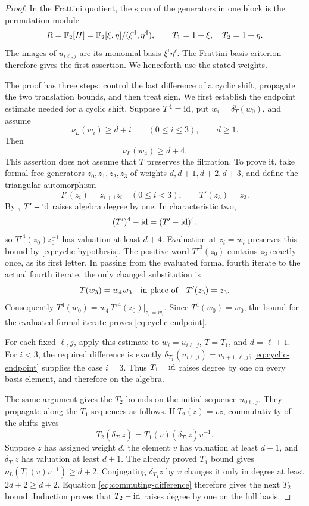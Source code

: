 \begin{proof}
In the Frattini quotient, the span of the generators in one block is
the permutation module
\[
 R=\mathbb F_2[H]
   =\mathbb F_2[\xi,\eta]/(\xi^4,\eta^4),
 \qquad T_1=1+\xi,\quad T_2=1+\eta.
\]
The images of \(u_{i\ell,j}\) are its monomial basis
\(\xi^i\eta^\ell\).  The Frattini basis criterion therefore gives the
first assertion.  We henceforth use the stated weights.

The proof has three steps: control the last difference of a cyclic
shift, propagate the two translation bounds, and then treat sign.
We first establish the endpoint estimate needed for a cyclic shift.
Suppose \(T^4=\operatorname{id}\), put \(w_i=\delta_T^i(w_0)\), and assume
\begin{equation}\label{eq:cyclic-hypothesis}
 \nu_L(w_i)\ge d+i\qquad(0\le i\le3),
 \qquad d\ge1.
\end{equation}
Then
\begin{equation}\label{eq:cyclic-endpoint}
 \nu_L(w_4)\ge d+4.
\end{equation}
This assertion does not assume that \(T\) preserves the filtration.
To prove it, take formal free generators \(z_0,z_1,z_2,z_3\) of weights
\(d,d+1,d+2,d+3\), and define the triangular automorphism
\[
 T'(z_i)=z_{i+1}z_i\quad(0\le i<3),
 \qquad T'(z_3)=z_3.
\]
By , \(T'-\operatorname{id}\) raises algebra degree by one.
In characteristic two,
\[
 (T')^4-\operatorname{id}=(T'-\operatorname{id})^4,
\]
so \(T'^4(z_0)z_0^{-1}\) has valuation at least \(d+4\).
Evaluation at \(z_i=w_i\) preserves this bound by
\eqref{eq:cyclic-hypothesis}.  The positive word \(T'^3(z_0)\) contains
\(z_3\) exactly once, as its first letter.  In passing from the
evaluated formal fourth iterate to the actual fourth iterate, the only
changed substitution is
\[
 T(w_3)=w_4w_3
 \quad\hbox{in place of}\quad
 T'(z_3)=z_3.
\]
Consequently \(T^4(w_0)=w_4\,T'^4(z_0)|_{z_i=w_i}\).
Since \(T^4(w_0)=w_0\), the bound for the evaluated formal iterate
proves \eqref{eq:cyclic-endpoint}.

For each fixed \(\ell,j\), apply this estimate to
\(w_i=u_{i\ell,j}\), \(T=T_1\), and \(d=\ell+1\).
For \(i<3\), the required difference is exactly
\(\delta_{T_1}(u_{i\ell,j})=u_{i+1,\ell,j}\);
\eqref{eq:cyclic-endpoint} supplies the case \(i=3\).
Thus \(T_1-\operatorname{id}\) raises degree by one on every basis element, and
therefore on the algebra.

The same argument gives the \(T_2\) bounds on the initial sequence
\(u_{0\ell,j}\).  They propagate along the \(T_1\)-sequences as follows.
If \(T_2(z)=vz\), commutativity of the shifts gives
\begin{equation}\label{eq:commuting-difference}
 T_2(\delta_{T_1}z)
   =T_1(v)(\delta_{T_1}z)v^{-1}.
\end{equation}
Suppose \(z\) has assigned weight \(d\), the element \(v\) has
valuation at least \(d+1\), and \(\delta_{T_1}z\) has valuation at
least \(d+1\).  The already proved \(T_1\) bound gives
\(\nu_L(T_1(v)v^{-1})\ge d+2\).  Conjugating
\(\delta_{T_1}z\) by \(v\) changes it only in degree at least
\(2d+2\ge d+2\).  Equation \eqref{eq:commuting-difference} therefore
gives the next \(T_2\) bound.  Induction proves that \(T_2-\operatorname{id}\)
raises degree by one on the full basis.


\end{proof}
